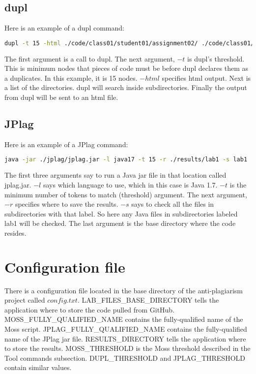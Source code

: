 \documentclass[12pt]{article}
\begin{document}
		\subsection{dupl}
			Here is an example of a dupl command:
			\begin{lstlisting}[language=bash, breaklines=true]
dupl -t 15 -html ./code/class01/student01/assignment02/ ./code/class01/student02/assignment02/ ./code/class01/student03/assignment02/ > assignment02.html &
			\end{lstlisting}
			\noindent The first argument is a call to dupl. The next argument, $-t$ is dupl's threshold. This is minimum nodes that pieces of code must be before dupl declares them as a duplicates. In this example, it is 15 nodes. $-html$ specifies html output. Next is a list of the directories. dupl will search inside subdirectories. Finally the output from dupl will be sent to an html file.
			
		\subsection{JPlag}
			Here is an example of a JPlag command:
			\begin{lstlisting}[language=bash, breaklines=true]		
java -jar ./jplag/jplag.jar -l java17 -t 15 -r ./results/lab1 -s lab1 ./students
			\end{lstlisting}
			\noindent The first three arguments say to run a Java jar file in that location called jplag.jar. $-l$ says which language to use, which in this case is Java 1.7. $-t$ is the minimum number of tokens to match (threshold) argument. The next argument, $-r$ specifies where to save the results. $-s$ says to check all the files in subdirectories with that label. So here any Java files in subdirectories labeled lab1 will be checked. The last argument is the base directory where the code resides.
			
	\section{Configuration file}
		There is a configuration file located in the base directory of the anti-plagiarism project called $config.txt$. LAB\_FILES\_BASE\_DIRECTORY tells the application where to store the code pulled from GitHub. MOSS\_FULLY\_QUALIFIED\_NAME contains the fully-qualified name of the Moss script. JPLAG\_FULLY\_QUALIFIED\_NAME contains the fully-qualified name of the JPlag jar file. RESULTS\_DIRECTORY tells the application where to store the results. MOSS\_THRESHOLD is the Moss threshold described in the Tool commands subsection. DUPL\_THRESHOLD and JPLAG\_THRESHOLD contain similar values.
			
\end{document}
